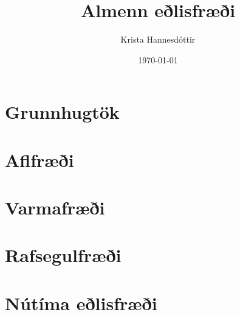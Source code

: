 \documentclass[openany, oneside, final]{memoir}
\title{Almenn eðlisfræði \\
	}
\author{
	Krista Hannesdóttir \\
	}
\date{\today}
\begin{document}

\maketitle



\tableofcontents

\mainmatter
%
% 

\part{Grunnhugtök}


% 
% 

\part{Aflfræði}


% 
% 

\part{Varmafræði}


% 
% 

\part{Rafsegulfræði}


% 
% 

\part{Nútíma eðlisfræði}


	

\end{document}
